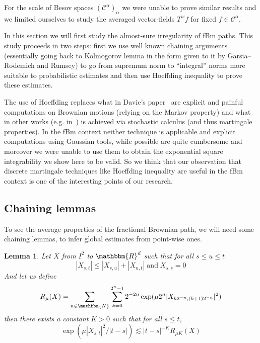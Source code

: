 \documentclass[a4paper,11pt]{article}
\newcommand{\tmop}[1]{\ensuremath{\operatorname{#1}}}
\newtheorem{lemma}[theorem]{Lemma}
\newcommand{\CC}{\mathscr C}
\begin{document}
For the scale of Besov spaces $\left( \CC^{\alpha} \right)_{\alpha}$ we were
unable to prove similar results and we limited ourselves to study the averaged
vector-fields $T^{w} f$ for fixed $f \in \CC^{\alpha}$.

In this section we will first study the almost-sure irregularity of fBm paths.
This study proceeds in two steps: first we use well known chaining arguments
(essentially going back to Kolmogorov lemma in the form given to it by
Garsia--Rodemich and Rumsey) to go from supremum norm to ``integral'' norms
more suitable to probabilistic estimates and then use Hoeffding inequality to
prove these estimates.

The use of Hoeffding replaces what in Davie's paper~{\cite{MR2377011}} are
explicit and painful computations on Brownian motions (relying on the Markov
property) and what in other works (e.g. in~{\cite{FGP}}) is achieved via
stochastic calculus (and thus martingale properties). In the fBm context
neither technique is applicable and explicit computations using Gaussian
tools, while possible are quite cumbersome and moreover we were unable to use
them to obtain the exponential square integrability we show here to be valid.
So we think that our observation that discrete martingale techniques like
Hoeffding inequality are useful in the fBm context is one of the interesting
points of our research.

\subsection{Chaining lemmas}

To see the average properties of the fractional Brownian path, we will need
some chaining lemmas, to infer global estimates from point-wise ones.

\begin{lemma}
  \label{lemma_chaining_time}Let $X$ from $I^{2}$ to $\mathbbm{R}^{d}$ such
  that for all $s \leqslant u \leqslant t$
  \[ | X_{s,t} | \leqslant | X_{s,u} | + | X_{u,t} |   \tmop{and}  X_{s,s} =0
  \]
  And let us define
  \[ R_{\mu} ( X ) = \sum_{n \in \mathbbm{N}} \sum_{k=0}^{2^{n} -1} 2^{-2n}
     \exp ( \mu 2^{n} | X_{k2^{-n} , ( k+1 ) 2^{-n}} |^{2} ) \]
  then there exists a constant $K>0$ such that for all $s \leqslant t$,
  \[ \exp ( \mu | X_{s,t} |^{2} / | t-s | ) \lesssim | t-s |^{-K} R_{\mu K} (
     X ) \]
\end{lemma}
\end{document}
